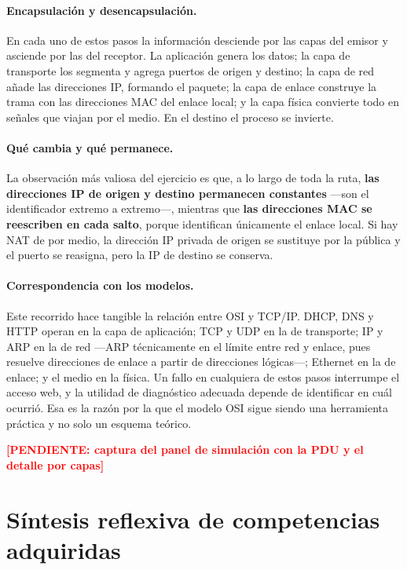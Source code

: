 \documentclass[11pt,a4paper]{article}
\newcommand{\pendiente}[1]{\textcolor{red}{\textbf{[PENDIENTE: #1]}}}
\begin{document}
\paragraph{Encapsulación y desencapsulación.} En cada uno de estos pasos la
información desciende por las capas del emisor y asciende por las del
receptor. La aplicación genera los datos; la capa de transporte los segmenta y
agrega puertos de origen y destino; la capa de red añade las direcciones IP,
formando el paquete; la capa de enlace construye la trama con las direcciones
MAC del enlace local; y la capa física convierte todo en señales que viajan por
el medio. En el destino el proceso se invierte.

\paragraph{Qué cambia y qué permanece.} La observación más valiosa del ejercicio
es que, a lo largo de toda la ruta, \textbf{las direcciones IP de origen y
destino permanecen constantes} —son el identificador extremo a extremo—,
mientras que \textbf{las direcciones MAC se reescriben en cada salto}, porque
identifican únicamente el enlace local. Si hay NAT de por medio, la dirección
IP privada de origen se sustituye por la pública y el puerto se reasigna, pero
la IP de destino se conserva.

\paragraph{Correspondencia con los modelos.} Este recorrido hace tangible la
relación entre OSI y TCP/IP. DHCP, DNS y HTTP operan en la capa de aplicación;
TCP y UDP en la de transporte; IP y ARP en la de red —ARP técnicamente en el
límite entre red y enlace, pues resuelve direcciones de enlace a partir de
direcciones lógicas—; Ethernet en la de enlace; y el medio en la física. Un
fallo en cualquiera de estos pasos interrumpe el acceso web, y la utilidad de
diagnóstico adecuada depende de identificar en cuál ocurrió. Esa es la razón
por la que el modelo OSI sigue siendo una herramienta práctica y no solo un
esquema teórico.

\pendiente{captura del panel de simulación con la PDU y el detalle por capas}

\section{Síntesis reflexiva de competencias adquiridas}
\end{document}
